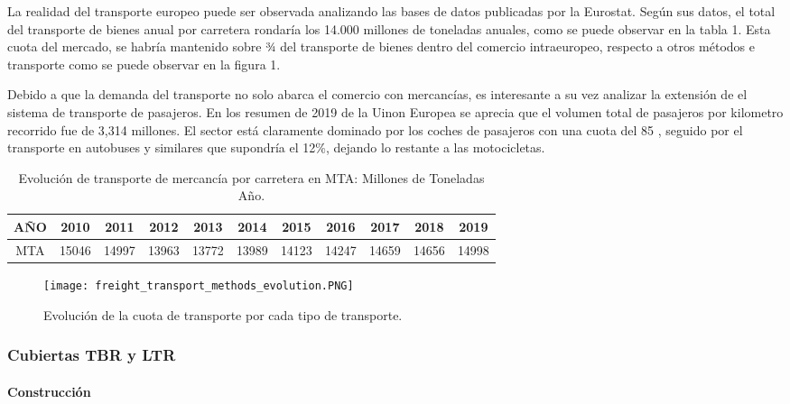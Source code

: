 La realidad del transporte europeo puede ser observada analizando las bases de datos publicadas por la Eurostat. Según sus datos, el total del transporte de bienes anual por carretera rondaría los 14.000 millones de toneladas anuales, como se puede observar en la tabla 1. Esta cuota del mercado, se habría mantenido sobre ¾ del transporte de bienes dentro del comercio intraeuropeo, respecto a otros métodos e transporte como se puede observar en la figura 1.

Debido a que la demanda del transporte no solo abarca el comercio con mercancías, es interesante a su vez analizar la extensión de el sistema de transporte de pasajeros. En los resumen de 2019 de la Uinon Europea se aprecia que el volumen total de pasajeros por kilometro recorrido fue de 3,314 millones. El sector está claramente dominado por los coches de pasajeros con una cuota del 85 , seguido por el transporte en autobuses y similares que supondría el 12\%, dejando lo restante a las motocicletas. 

\begin{table}[h!]
\centering
\begin{tabular}{|c|cccccccccc|}

	\hline
	AÑO & 2010 & 2011 & 2012 & 2013 & 2014 & 2015 & 2016 & 2017 & 2018 & 2019\\ 
	\hline
	MTA & 15046 & 14997 & 13963 & 13772 & 13989 & 14123 & 14247 & 14659 & 14656 & 14998\\ 
	\hline
	
\end{tabular}

\caption{Evolución de transporte de mercancía por carretera en MTA: Millones de Toneladas Año.}
\label{table:1}

\end{table}

\begin{figure}
    \begin{center}
        \texttt{[image: freight\_transport\_methods\_evolution.PNG]}    
    \end{center}
    \caption{Evolución de la cuota de transporte por cada tipo de transporte.}
\end{figure}

\subsubsection{Cubiertas TBR y LTR}

\paragraph{Construcción}

